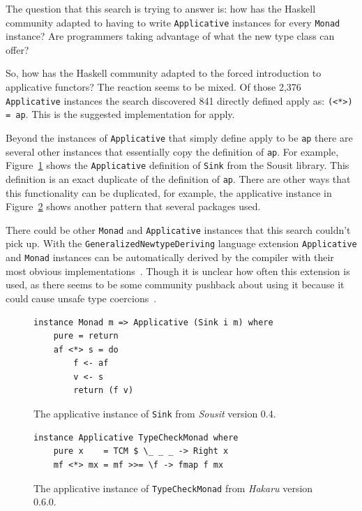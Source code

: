 The question that this search is trying to answer is: how has the Haskell community adapted to having to write \texttt{Applicative} instances for every \texttt{Monad} instance? Are programmers taking advantage of what the new type class can offer? 

So, how has the Haskell community adapted to the forced introduction to applicative functors? The reaction seems to be mixed. Of those 2,376 \texttt{Applicative} instances the search discovered 841 directly defined apply as: \texttt{(<*>) = ap}. This is the suggested implementation for apply. 
 
Beyond the instances of \texttt{Applicative} that simply define apply to be \texttt{ap} there are several other instances that essentially copy the definition of \texttt{ap}. For example, Figure~\ref{sousitAp} shows the \texttt{Applicative} definition of \texttt{Sink} from the Sousit library. This definition is an exact duplicate of the definition of \texttt{ap}. There are other ways that this functionality can be duplicated, for example, the applicative instance in Figure~\ref{appWithBind} shows another pattern that several packages used. 

There could be other \texttt{Monad} and \texttt{Applicative} instances that this search couldn't pick up. With the \texttt{GeneralizedNewtypeDeriving} language extension \texttt{Applicative} and \texttt{Monad} instances can be automatically derived by the compiler with their most obvious implementations~\citep{genDeriveBlog}. Though it is unclear how often this extension is used, as there seems to be some community pushback about using it because it could cause unsafe type coercions~\citep{genDeriveUnsafe}. 

\begin{figure}[t]
\begin{lstlisting}
instance Monad m => Applicative (Sink i m) where
    pure = return
    af <*> s = do 
        f <- af
        v <- s
        return (f v)
\end{lstlisting}
\caption{The applicative instance of \texttt{Sink} from \textit{Sousit} version 0.4.}
\label{sousitAp}
\end{figure}

\begin{figure}[t]
\begin{lstlisting}
instance Applicative TypeCheckMonad where
    pure x    = TCM $ \_ _ _ -> Right x
    mf <*> mx = mf >>= \f -> fmap f mx
\end{lstlisting}
\caption{The applicative instance of \texttt{TypeCheckMonad} from \textit{Hakaru} version 0.6.0.}
\label{appWithBind}
\end{figure}

